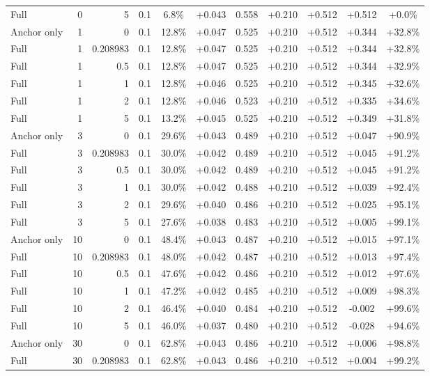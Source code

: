 \begin{table}[htbp]
\begin{tabular}{lrrrccccccc}
Full & 0 & 5 & 0.1 & 6.8\% & +0.043 & 0.558 & +0.210 & +0.512 & +0.512 & +0.0\% \\
Anchor only & 1 & 0 & 0.1 & 12.8\% & +0.047 & 0.525 & +0.210 & +0.512 & +0.344 & +32.8\% \\
Full & 1 & 0.208983 & 0.1 & 12.8\% & +0.047 & 0.525 & +0.210 & +0.512 & +0.344 & +32.8\% \\
Full & 1 & 0.5 & 0.1 & 12.8\% & +0.047 & 0.525 & +0.210 & +0.512 & +0.344 & +32.9\% \\
Full & 1 & 1 & 0.1 & 12.8\% & +0.046 & 0.525 & +0.210 & +0.512 & +0.345 & +32.6\% \\
Full & 1 & 2 & 0.1 & 12.8\% & +0.046 & 0.523 & +0.210 & +0.512 & +0.335 & +34.6\% \\
Full & 1 & 5 & 0.1 & 13.2\% & +0.045 & 0.525 & +0.210 & +0.512 & +0.349 & +31.8\% \\
Anchor only & 3 & 0 & 0.1 & 29.6\% & +0.043 & 0.489 & +0.210 & +0.512 & +0.047 & +90.9\% \\
Full & 3 & 0.208983 & 0.1 & 30.0\% & +0.042 & 0.489 & +0.210 & +0.512 & +0.045 & +91.2\% \\
Full & 3 & 0.5 & 0.1 & 30.0\% & +0.042 & 0.489 & +0.210 & +0.512 & +0.045 & +91.2\% \\
Full & 3 & 1 & 0.1 & 30.0\% & +0.042 & 0.488 & +0.210 & +0.512 & +0.039 & +92.4\% \\
Full & 3 & 2 & 0.1 & 29.6\% & +0.040 & 0.486 & +0.210 & +0.512 & +0.025 & +95.1\% \\
Full & 3 & 5 & 0.1 & 27.6\% & +0.038 & 0.483 & +0.210 & +0.512 & +0.005 & +99.1\% \\
Anchor only & 10 & 0 & 0.1 & 48.4\% & +0.043 & 0.487 & +0.210 & +0.512 & +0.015 & +97.1\% \\
Full & 10 & 0.208983 & 0.1 & 48.0\% & +0.042 & 0.487 & +0.210 & +0.512 & +0.013 & +97.4\% \\
Full & 10 & 0.5 & 0.1 & 47.6\% & +0.042 & 0.486 & +0.210 & +0.512 & +0.012 & +97.6\% \\
Full & 10 & 1 & 0.1 & 47.2\% & +0.042 & 0.485 & +0.210 & +0.512 & +0.009 & +98.3\% \\
Full & 10 & 2 & 0.1 & 46.4\% & +0.040 & 0.484 & +0.210 & +0.512 & -0.002 & +99.6\% \\
Full & 10 & 5 & 0.1 & 46.0\% & +0.037 & 0.480 & +0.210 & +0.512 & -0.028 & +94.6\% \\
Anchor only & 30 & 0 & 0.1 & 62.8\% & +0.043 & 0.486 & +0.210 & +0.512 & +0.006 & +98.8\% \\
Full & 30 & 0.208983 & 0.1 & 62.8\% & +0.043 & 0.486 & +0.210 & +0.512 & +0.004 & +99.2\% \\

\end{tabular}
\end{table}
